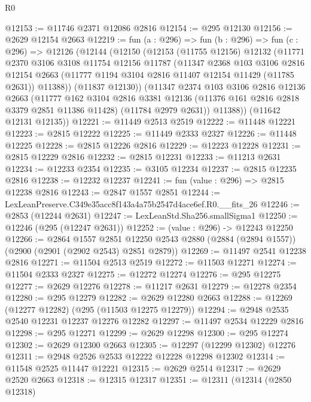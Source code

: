 \begin{lexlean}{R0}
\begin{coremodule}
@12153 := @11746 @2371 @12086 @2816
@12154 := @295 @12130
@12156 := @2629 @12154 @2663
@12219 := fun (a : @296) =>
  fun (b : @296) =>
  fun (c : @296) =>
  @12126
    (@12144
      (@12150
        (@12153
          (@11755 @12156)
          @12132
          (@11771
            @2370
            @3106
            @3108
            @11754
            @12156
            @11787
            (@11347
              @2368
              @103
              @3106
              @2816
              @12154
              @2663
              (@11777 @1194 @3104 @2816 @11407 @12154 @11429 (@11785 @2631))
              @11388))
          (@11837 @12130))
        (@11347
          @2374
          @103
          @3106
          @2816
          @12136
          @2663
          (@11777
            @162
            @3104
            @2816
            @3381
            @12136
            (@11376 @161 @2816 @2818 @3379 @2851 @11386 @11428)
            (@11784 @2979 @2631))
          @11388))
      (@11642 @12131 @12135))
@12221 := @11449 @2513 @2519
@12222 := @11448 @12221
@12223 := @2815 @12222
@12225 := @11449 @2333 @2327
@12226 := @11448 @12225
@12228 := @2815 @12226 @2816
@12229 := @12223 @12228
@12231 := @2815 @12229 @2816
@12232 := @2815 @12231
@12233 := @11213 @2631
@12234 := @12233 @2354
@12235 := @3105 @12234
@12237 := @2815 @12235 @2816
@12238 := @12232 @12237
@12241 := fun (value : @296) => @2815 @12238 @2816
@12243 := @2847 @1557 @2851
@12244 := LexLeanPreserve.C349e35acc8f143a4a75b2547d4ace6ef.R0.__fits_26
@12246 := @2853 (@12244 @2631)
@12247 := LexLeanStd.Sha256.smallSigma1
@12250 := @12246 (@295 (@12247 @2631))
@12252 := (value : @296) -> @12243 @12250
@12266 := @2864
    @1557
    @2851
    @12250
    @2543
    @2880
    (@2884 (@2894 @1557))
    (@2900 (@2901 (@2902 @2543) @2851 @2879))
@12269 := @11497 @2541 @12238 @2816
@12271 := @11504 @2513 @2519
@12272 := @11503 @12271
@12274 := @11504 @2333 @2327
@12275 := @12272 @12274
@12276 := @295 @12275
@12277 := @2629 @12276
@12278 := @11217 @2631
@12279 := @12278 @2354
@12280 := @295 @12279
@12282 := @2629 @12280 @2663
@12288 := @12269 (@12277 @12282) (@295 (@11503 @12275 @12279))
@12294 := @2948 @2535 @2540 @12231 @12237 @12276 @12282
@12297 := @11497 @2534 @12229 @2816
@12298 := @295 @12271
@12299 := @2629 @12298
@12300 := @295 @12274
@12302 := @2629 @12300 @2663
@12305 := @12297 (@12299 @12302) @12276
@12311 := @2948 @2526 @2533 @12222 @12228 @12298 @12302
@12314 := @11548 @2525 @11447 @12221
@12315 := @2629 @2514
@12317 := @2629 @2520 @2663
@12318 := @12315 @12317
@12351 := @12311
    (@12314
      (@2850 @12318)

\end{coremodule}
\end{lexlean}
